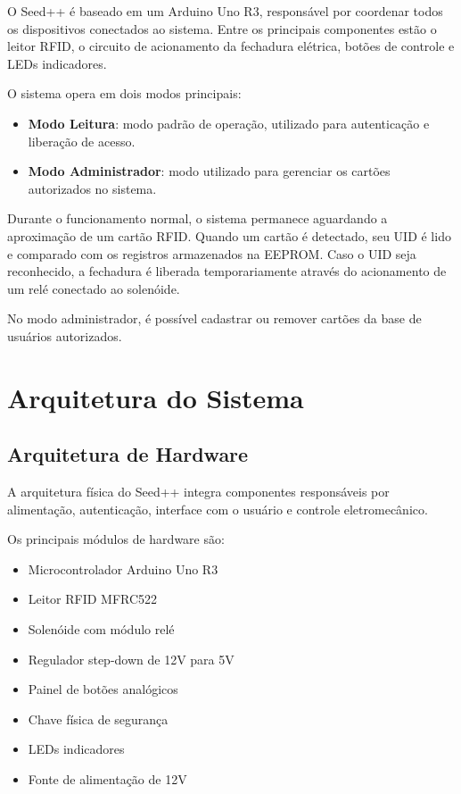 \documentclass[a4paper,12pt]{article}
\begin{document}
O Seed++ é baseado em um Arduino Uno R3, responsável por coordenar todos os dispositivos conectados ao sistema. Entre os principais componentes estão o leitor RFID, o circuito de acionamento da fechadura elétrica, botões de controle e LEDs indicadores.

O sistema opera em dois modos principais:

\begin{itemize}
    \item \textbf{Modo Leitura}: modo padrão de operação, utilizado para autenticação e liberação de acesso.
    \item \textbf{Modo Administrador}: modo utilizado para gerenciar os cartões autorizados no sistema.
\end{itemize}

Durante o funcionamento normal, o sistema permanece aguardando a aproximação de um cartão RFID. Quando um cartão é detectado, seu UID é lido e comparado com os registros armazenados na EEPROM. Caso o UID seja reconhecido, a fechadura é liberada temporariamente através do acionamento de um relé conectado ao solenóide.

No modo administrador, é possível cadastrar ou remover cartões da base de usuários autorizados.

\section{Arquitetura do Sistema}

\subsection{Arquitetura de Hardware}

A arquitetura física do Seed++ integra componentes responsáveis por alimentação, autenticação, interface com o usuário e controle eletromecânico.

Os principais módulos de hardware são:

\begin{itemize}
    \item Microcontrolador Arduino Uno R3
    \item Leitor RFID MFRC522
    \item Solenóide com módulo relé
    \item Regulador step-down de 12V para 5V
    \item Painel de botões analógicos
    \item Chave física de segurança
    \item LEDs indicadores
    \item Fonte de alimentação de 12V
\end{itemize}
\end{document}
